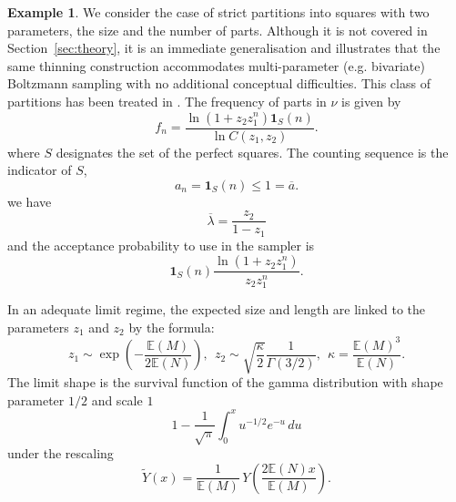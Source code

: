 \documentclass[a4paper,10pt]{article}
\theoremstyle{definition}
\newtheorem{example}[theorem]{Example}
\newcommand{\EE}{\mathbb{E}}
\begin{document}
\begin{example}\label{ex:square}
    We consider the case of strict partitions into squares with two parameters, the size and the number of parts. Although it is not covered in Section~\ref{sec:theory}, it is an immediate generalisation and illustrates that the same thinning construction accommodates multi-parameter (e.g. bivariate) Boltzmann sampling with no additional conceptual difficulties. This class of partitions has been treated in \cite{pey2}. The frequency of parts in $\nu$ is given by
    \begin{equation}\label{eq:mult-bivar}
        f_n = \frac{\ln (1+z_2z_1^{n})\mathbf{1}_S(n)}{\ln C(z_1,z_2)}.
    \end{equation}
    where $S$ designates the set of the perfect squares. The counting sequence is the indicator of $S$,
    \begin{equation*}
        a_n = \mathbf{1}_S(n) \leq 1=\overline{a}.
    \end{equation*}
    we have
    \begin{equation*}
        \overline{\lambda}= \frac{z_2}{1-z_1}
    \end{equation*}
    and the acceptance probability to use in the sampler is
    \begin{equation*}
        \mathbf{1}_S(n) \frac{\ln(1+z_2z_1^n)}{z_2z_1^n}.
    \end{equation*}

    In an adequate limit regime, the expected size and length are linked to the parameters $z_1$ and $z_2$ by the formula:
    \begin{equation*}
        z_1 \sim \exp\left(-\frac{\EE(M)}{2\EE(N)} \right),~~ z_2 \sim \sqrt{\frac{\kappa}{2}}\frac{1}{\Gamma(3/2)}, ~~ \kappa = \frac{\EE(M)^3}{\EE(N)}.
    \end{equation*}
    The limit shape is the survival function of the gamma distribution with shape parameter $1/2$ and scale $1$
    \begin{equation*}
        1-\frac{1}{\sqrt{\pi}}\int_0^x u^{-1/2}e^{-u}\, du
    \end{equation*}
    under the rescaling
    \begin{equation*}
        \widetilde{Y}(x) = \frac{1}{\EE(M)}\, Y\left(\frac{2\EE(N)x}{\EE(M)}\right).
    \end{equation*}
    

\end{example}
\end{document}
